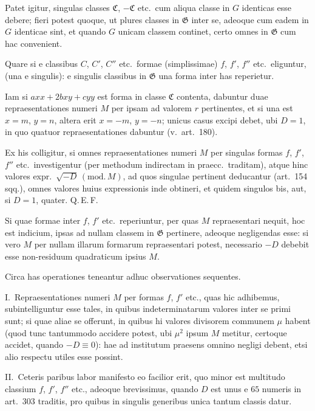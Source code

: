 \documentclass[12pt,a4paper]{article}
\theoremstyle{plain}
\theoremstyle{definition}
\theoremstyle{remark}
\begin{document}
Patet igitur, singulas classes $\mathfrak{C}$, $-\mathfrak{C}$ etc.\ cum aliqua classe in $G$ identicas esse debere; fieri potest quoque, ut plures classes in $\mathfrak{G}$ inter se, adeoque cum eadem in $G$ identicae sint, et quando $G$ unicam classem continet, certo omnes in $\mathfrak{G}$ cum hac convenient.

Quare si e classibus $C$, $C'$, $C''$ etc.\ formae (simplissimae) $f$, $f'$, $f''$ etc.\ eliguntur, (una e singulis): e singulis classibus in $\mathfrak{G}$ una forma inter has reperietur.

Iam si $axx+2bxy+cyy$ est forma in classe $\mathfrak{C}$ contenta, dabuntur duae repraesentationes numeri $M$ per ipsam ad valorem $r$ pertinentes, et si una est $x=m$, $y=n$, altera erit $x=-m$, $y=-n$; unicus casus excipi debet, ubi $D=1$, in quo quatuor repraesentationes dabuntur (v.\ art.\ 180).

Ex his colligitur, si omnes repraesentationes numeri $M$ per singulas formas $f$, $f'$, $f''$ etc.\ investigentur (per methodum indirectam in praecc.\ traditam), atque hinc valores expr.~$\surd{-D}\,(\mathrm{mod.}\,M)$, ad quos singulae pertinent deducantur (art.\ 154 sqq.), omnes valores huius expressionis inde obtineri, et quidem singulos bis, aut, si $D=1$, quater. Q.\,E.\,F.

Si quae formae inter $f$, $f'$ etc.\ reperiuntur, per quas $M$ repraesentari nequit, hoc est indicium, ipsas ad nullam classem in $\mathfrak{G}$ pertinere, adeoque negligendas esse: si vero $M$ per nullam illarum formarum repraesentari potest, necessario $-D$ debebit esse non-residuum quadraticum ipsius $M$.

Circa has operationes teneantur adhuc observationes sequentes.

\textsc{I.}\ Repraesentationes numeri $M$ per formas $f$, $f'$ etc., quas hic adhibemus, subintelliguntur esse tales, in quibus indeterminatarum valores inter se primi sunt; si quae aliae se offerunt, in quibus hi valores divisorem communem $\mu$ habent (quod tunc tantummodo accidere potest, ubi $\mu^2$ ipsum $M$ metitur, certoque accidet, quando $-D\equiv 0$): hae ad institutum praesens omnino negligi debent, etsi alio respectu utiles esse possint.

\textsc{II.}\ Ceteris paribus labor manifesto eo facilior erit, quo minor est multitudo classium $f$, $f'$, $f''$ etc., adeoque brevissimus, quando $D$ est unus e $65$ numeris in art.\ 303 traditis, pro quibus in singulis generibus unica tantum classis datur.
\end{document}
